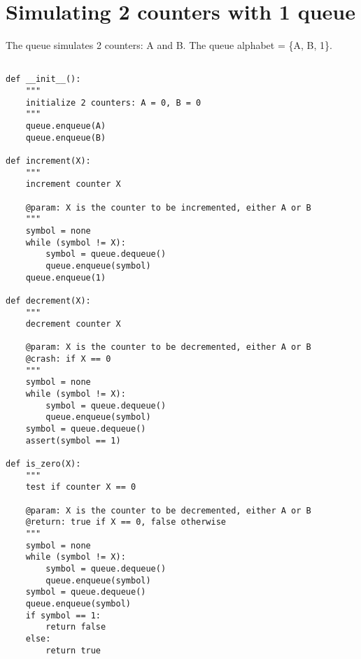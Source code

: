 \documentclass{article}
\begin{document}
\section{Simulating 2 counters with 1 queue}
The queue simulates 2 counters: A and B. The queue alphabet = \{A, B, 1\}.
\begin{lstlisting}

def __init__():
	"""
	initialize 2 counters: A = 0, B = 0
	"""
	queue.enqueue(A)
	queue.enqueue(B)
	
def increment(X):
	"""
	increment counter X
	
	@param: X is the counter to be incremented, either A or B
	"""
	symbol = none
	while (symbol != X):
		symbol = queue.dequeue()
		queue.enqueue(symbol)
	queue.enqueue(1)

def decrement(X):
	"""
	decrement counter X
	
	@param: X is the counter to be decremented, either A or B
	@crash: if X == 0
	"""
	symbol = none
	while (symbol != X):
		symbol = queue.dequeue()
		queue.enqueue(symbol)
	symbol = queue.dequeue()
	assert(symbol == 1)
	
def is_zero(X):
	"""
	test if counter X == 0
	
	@param: X is the counter to be decremented, either A or B
	@return: true if X == 0, false otherwise
	"""
	symbol = none
	while (symbol != X):
		symbol = queue.dequeue()
		queue.enqueue(symbol)
	symbol = queue.dequeue()	
	queue.enqueue(symbol)
	if symbol == 1:
		return false
	else:
		return true
	
\end{lstlisting}	
\end{document}
